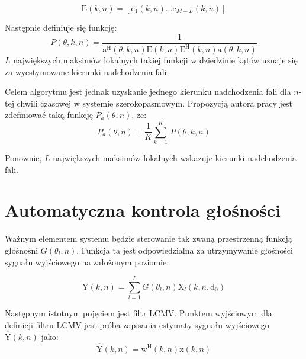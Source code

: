 \begin{equation}
    \label{equation:eigenvectors}
    \bm{\mathrm{E}}(k,n)=
    [\bm{\mathrm{e}}_{1}(k,n)...
    \bm{\mathrm{e}}_{M-L}(k,n)]
\end{equation}

\noindent Następnie definiuje się funkcję:
\begin{equation}
    \label{equation:P}
    P(\theta,k,n)=
    \dfrac{1}{
    \bm{\mathrm{a}}^{\mathrm{H}}(\theta,k,n)
    \bm{\mathrm{E}}(k,n)
    \bm{\mathrm{E}}^{\mathrm{H}}(k,n)
    \bm{\mathrm{a}}(\theta,k,n)
    }
\end{equation}
\noindent 
$L$ największych maksimów lokalnych takiej funkcji w dziedzinie kątów uznaje się za wyestymowane kierunki nadchodzenia fali.

\noindent Celem algorytmu jest jednak uzyskanie jednego kierunku nadchodzenia fali dla $n$-tej chwili czasowej w systemie szerokopasmowym. Propozycją autora pracy jest zdefiniować taką funkcję $P_{a}(\theta,n)$, że:
\begin{equation}
    \label{equation:Pa}
    P_{a}(\theta,n) = 
    \dfrac{1}{K}\sum_{k=1}^{K}\,P(\theta,k,n)   
\end{equation}

\noindent Ponownie, $L$ największych maksimów lokalnych wskazuje kierunki nadchodzenia fali.


\section{Automatyczna kontrola głośności}

Ważnym elementem systemu będzie sterowanie tak zwaną przestrzenną funkcją głośnośni $G(\theta_{l},n)$. Funkcja ta jest odpowiedzialna za utrzymywanie głośności sygnału wyjściowego na założonym poziomie:

\begin{equation}
    \label{equation:G}
    \mathrm{Y}(k,n)= 
    \sum_{l=1}^{L} G(\theta_{l},n)
    \mathrm{X}_{l}(k,n,\bm{\mathrm{d}}_0)
\end{equation}

\noindent Następnym istotnym pojęciem jest filtr LCMV. Punktem wyjściowym dla definicji filtru LCMV jest próba zapisania estymaty sygnału wyjściowego $\hat{\mathrm{Y}}(k,n)$ jako:
\begin{equation}
    \label{equation:Y estimation}
    \hat{\mathrm{Y}}(k,n)=
    \bm{\mathrm{w}}^{\mathrm{H}}(k,n)
    \bm{\mathrm{x}}(k,n)
\end{equation}

